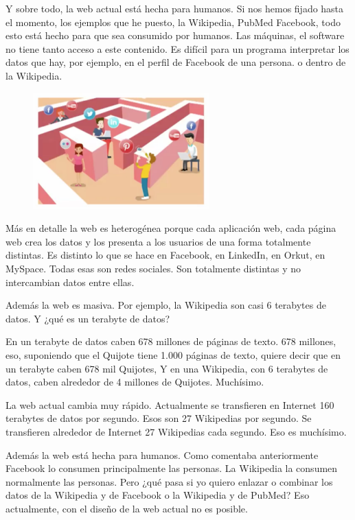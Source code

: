  Y sobre todo, la web actual está hecha para humanos. Si nos hemos fijado hasta el momento, los ejemplos que he puesto, la Wikipedia, PubMed Facebook, todo esto está hecho para que sea consumido por humanos. Las máquinas, el software no tiene tanto acceso a este contenido. Es difícil para un programa interpretar los datos que hay, por ejemplo, en el perfil de Facebook de una persona. o dentro de la Wikipedia.
 
 \begin{figure}[H]
 	\centering
 	\includegraphics[height=4.5cm]{imagenes/capitulo3/2}
 	\caption{}
 	\label{}
 \end{figure}
 
 
 
 
 Más en detalle la web es heterogénea porque cada aplicación web, cada página web crea los datos y los presenta a los usuarios de una forma totalmente distintas. Es distinto lo que se hace en Facebook, en LinkedIn, en Orkut, en MySpace. Todas esas son redes sociales. Son totalmente distintas y no intercambian datos entre ellas.
 
 Además la web es masiva. Por ejemplo, la Wikipedia son casi 6 terabytes de datos. Y ¿qué es un terabyte de datos?
 
 En un terabyte de datos caben 678 millones de páginas de texto. 678 millones, eso, suponiendo que el Quijote tiene 1.000 páginas de texto, quiere decir que en un terabyte caben 678 mil Quijotes, Y en una Wikipedia, con 6 terabytes de datos, caben alrededor de 4 millones de Quijotes. Muchísimo.
 
 La web actual cambia muy rápido. Actualmente se transfieren en Internet 160 terabytes de datos por segundo. Esos son 27 Wikipedias por segundo. Se transfieren alrededor de Internet 27 Wikipedias cada segundo. Eso es muchísimo.
 
 Además la web está hecha para humanos. Como comentaba anteriormente Facebook lo consumen principalmente las personas. La Wikipedia la consumen normalmente las personas. Pero ¿qué pasa si yo quiero enlazar o combinar los datos de la Wikipedia y de Facebook o la Wikipedia y de PubMed? Eso actualmente, con el diseño de la web actual no es posible.
 
